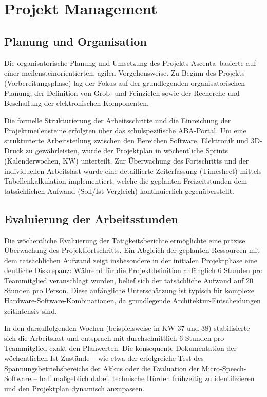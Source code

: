 \chapter{Projekt Management}

\section{Planung und Organisation}
Die organisatorische Planung und Umsetzung des Projekts \glqq Ascenta\grqq\ basierte auf einer meilensteinorientierten, agilen Vorgehensweise. Zu Beginn des Projekts (Vorbereitungsphase) lag der Fokus auf der grundlegenden organisatorischen Planung, der Definition von Grob- und Feinzielen sowie der Recherche und Beschaffung der elektronischen Komponenten. 

Die formelle Strukturierung der Arbeitsschritte und die Einreichung der Projektmeilensteine erfolgten über das schulspezifische ABA-Portal. Um eine strukturierte Arbeitsteilung zwischen den Bereichen Software, Elektronik und 3D-Druck zu gewährleisten, wurde der Projektplan in wöchentliche Sprints (Kalenderwochen, KW) unterteilt. Zur Überwachung des Fortschritts und der individuellen Arbeitslast wurde eine detaillierte Zeiterfassung (Timesheet) mittels Tabellenkalkulation implementiert, welche die geplanten Freizeitstunden dem tatsächlichen Aufwand (Soll/Ist-Vergleich) kontinuierlich gegenüberstellt.

\section{Evaluierung der Arbeitsstunden}
Die wöchentliche Evaluierung der Tätigkeitsberichte ermöglichte eine präzise Überwachung des Projektfortschritts. Ein Abgleich der geplanten Ressourcen mit dem tatsächlichen Aufwand zeigt insbesondere in der initialen Projektphase eine deutliche Diskrepanz: Während für die Projektdefinition anfänglich 6 Stunden pro Teammitglied veranschlagt wurden, belief sich der tatsächliche Aufwand auf 20 Stunden pro Person. Diese anfängliche Unterschätzung ist typisch für komplexe Hardware-Software-Kombinationen, da grundlegende Architektur-Entscheidungen zeitintensiv sind.

In den darauffolgenden Wochen (beispielsweise in KW 37 und 38) stabilisierte sich die Arbeitslast und entsprach mit durchschnittlich 6 Stunden pro Teammitglied exakt den Planwerten. Die konsequente Dokumentation der wöchentlichen Ist-Zustände – wie etwa der erfolgreiche Test des Spannungsbetriebsbereichs der Akkus oder die Evaluation der Micro-Speech-Software – half maßgeblich dabei, technische Hürden frühzeitig zu identifizieren und den Projektplan dynamisch anzupassen. 

